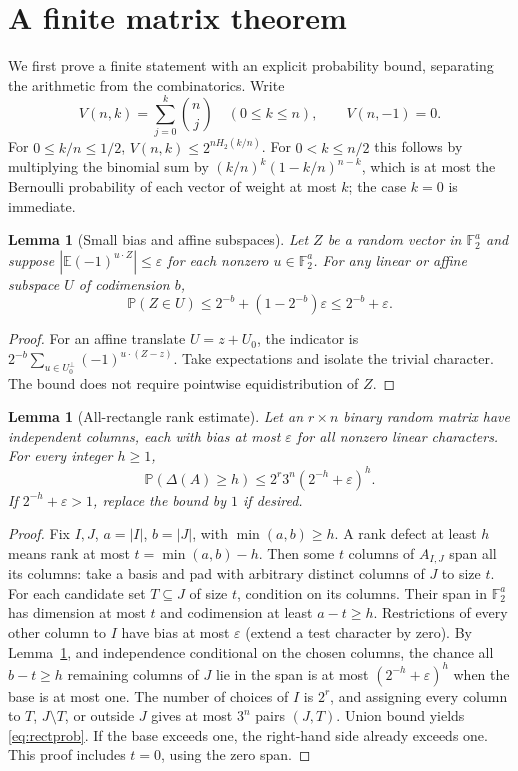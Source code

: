 \documentclass[11pt]{article}
\newtheorem{lemma}[theorem]{Lemma}
\theoremstyle{remark}\newtheorem{remark}[theorem]{Remark}
\newcommand{\F}{\mathbb F_2}
\newcommand{\E}{\mathbb E}
\newcommand{\Prb}{\mathbb P}
\newcommand{\eps}{\varepsilon}
\newcommand{\Hbin}{H_2}
\begin{document}
\section{A finite matrix theorem}\label{sec:matrix}
We first prove a finite statement with an explicit probability bound, separating the arithmetic from the combinatorics. Write
\[
 V(n,k)=\sum_{j=0}^k\binom nj\quad(0\le k\le n),\qquad V(n,-1)=0.
\]
For $0\le k/n\le1/2$, $V(n,k)\le 2^{n\Hbin(k/n)}$. For $0<k\le n/2$ this follows by multiplying the binomial sum by $(k/n)^k(1-k/n)^{n-k}$, which is at most the Bernoulli probability of each vector of weight at most $k$; the case $k=0$ is immediate.

\begin{lemma}[Small bias and affine subspaces]\label{lem:space}
Let $Z$ be a random vector in $\F^a$ and suppose $|\E(-1)^{u\cdot Z}|\le\eps$ for each nonzero $u\in\F^a$. For any linear or affine subspace $U$ of codimension $b$,
\[
 \Prb(Z\in U)\le 2^{-b}+(1-2^{-b})\eps\le 2^{-b}+\eps.
\]
\end{lemma}
\begin{proof}
For an affine translate $U=z+U_0$, the indicator is $2^{-b}\sum_{u\in U_0^\perp}(-1)^{u\cdot(Z-z)}$. Take expectations and isolate the trivial character. The bound does not require pointwise equidistribution of $Z$.
\end{proof}

\begin{lemma}[All-rectangle rank estimate]\label{lem:rectangle}
Let an $r\times n$ binary random matrix have independent columns, each with bias at most $\eps$ for all nonzero linear characters. For every integer $h\ge1$,
\begin{equation}\label{eq:rectprob}
 \Prb(\Delta(A)\ge h)\le 2^r3^n(2^{-h}+\eps)^h.
\end{equation}
If $2^{-h}+\eps>1$, replace the bound by $1$ if desired.
\end{lemma}
\begin{proof}
Fix $I,J$, $a=|I|$, $b=|J|$, with $\min(a,b)\ge h$. A rank defect at least $h$ means rank at most $t=\min(a,b)-h$. Then some $t$ columns of $A_{I,J}$ span all its columns: take a basis and pad with arbitrary distinct columns of $J$ to size $t$. For each candidate set $T\subseteq J$ of size $t$, condition on its columns. Their span in $\F^a$ has dimension at most $t$ and codimension at least $a-t\ge h$. Restrictions of every other column to $I$ have bias at most $\eps$ (extend a test character by zero). By Lemma~\ref{lem:space}, and independence conditional on the chosen columns, the chance all $b-t\ge h$ remaining columns of $J$ lie in the span is at most $(2^{-h}+\eps)^h$ when the base is at most one. The number of choices of $I$ is $2^r$, and assigning every column to $T$, $J\setminus T$, or outside $J$ gives at most $3^n$ pairs $(J,T)$. Union bound yields \eqref{eq:rectprob}. If the base exceeds one, the right-hand side already exceeds one. This proof includes $t=0$, using the zero span.
\end{proof}
\end{document}
